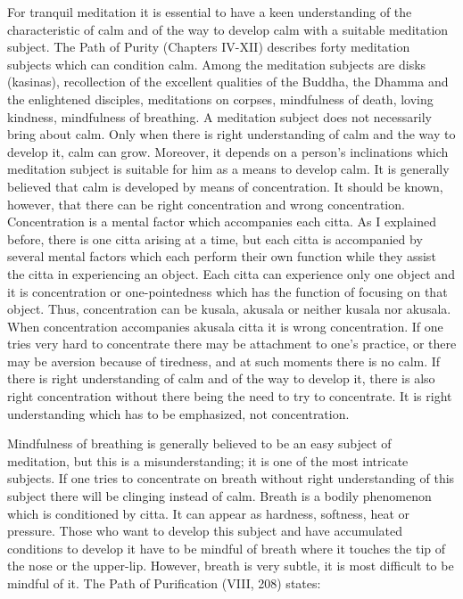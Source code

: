 \documentclass{book}
\begin{document}
For tranquil meditation it is essential to have a keen understanding of
the characteristic of calm and of the way to develop calm with a
suitable meditation subject. The Path of Purity (Chapters IV-XII)
describes forty meditation subjects which can condition calm. Among the
meditation subjects are disks (kasinas), recollection of the excellent
qualities of the Buddha, the Dhamma and the enlightened disciples,
meditations on corpses, mindfulness of death, loving kindness,
mindfulness of breathing. A meditation subject does not necessarily
bring about calm. Only when there is right understanding of calm and the
way to develop it, calm can grow. Moreover, it depends on a person's
inclinations which meditation subject is suitable for him as a means to
develop calm. It is generally believed that calm is developed by means
of concentration. It should be known, however, that there can be right
concentration and wrong concentration. Concentration is a mental factor
which accompanies each citta. As I explained before, there is one citta
arising at a time, but each citta is accompanied by several mental
factors which each perform their own function while they assist the
citta in experiencing an object. Each citta can experience only one
object and it is concentration or one-pointedness which has the function
of focusing on that object. Thus, concentration can be kusala, akusala
or neither kusala nor akusala. When concentration accompanies akusala
citta it is wrong concentration. If one tries very hard to concentrate
there may be attachment to one's practice, or there may be aversion
because of tiredness, and at such moments there is no calm. If there is
right understanding of calm and of the way to develop it, there is also
right concentration without there being the need to try to concentrate.
It is right understanding which has to be emphasized, not concentration.

Mindfulness of breathing is generally believed to be an easy subject of
meditation, but this is a misunderstanding; it is one of the most
intricate subjects. If one tries to concentrate on breath without right
understanding of this subject there will be clinging instead of calm.
Breath is a bodily phenomenon which is conditioned by citta. It can
appear as hardness, softness, heat or pressure. Those who want to
develop this subject and have accumulated conditions to develop it have
to be mindful of breath where it touches the tip of the nose or the
upper-lip. However, breath is very subtle, it is most difficult to be
mindful of it. The Path of Purification (VIII, 208) states:
\end{document}
